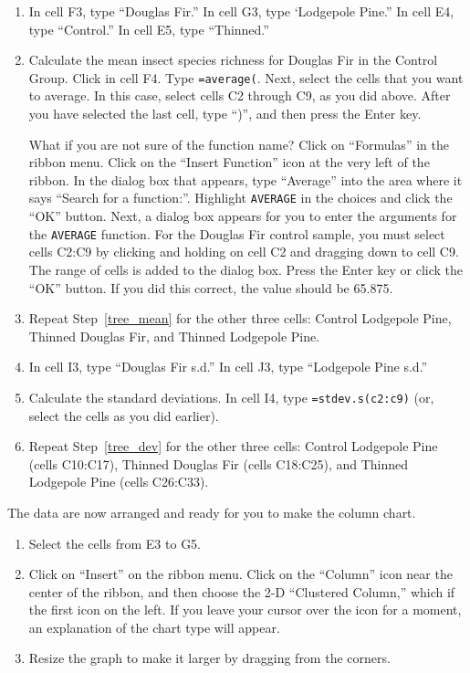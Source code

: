 \documentclass[12pt, hidelinks]{exam}
\begin{document}
\begin{enumerate}
	\item In cell F3, type “Douglas Fir.” In cell G3, type ‘Lodgepole Pine.” In cell E4, type “Control.” In cell E5, type “Thinned.” 

	\item \label{tree_mean} Calculate the mean insect species richness for Douglas Fir in the Control Group. Click in cell F4. Type \texttt{=average(}. Next, select the cells that you want to average. In this case, select cells C2 through C9, as you did above. After you have selected the last cell, type “)”, and then press the Enter key. 

What if you are not sure of the function name? Click on “Formulas” in the ribbon menu. Click on the “Insert Function” icon at the very left of the ribbon. In the dialog box that appears, type “Average” into the area where it says “Search for a function:”. Highlight \texttt{AVERAGE} in the choices and click the “OK” button. Next, a dialog box appears for you to enter the arguments for the \texttt{AVERAGE} function. For the Douglas Fir control sample, you must select cells C2:C9 by clicking and holding on cell C2 and dragging down to cell C9. The range of cells is added to the dialog box. Press the Enter key or click the “OK” button. If you did this correct, the value should be 65.875.

	\item Repeat Step~\ref{tree_mean} for the other three cells: Control Lodgepole Pine, Thinned Douglas Fir, and Thinned Lodgepole Pine. 
	
	\item \label{tree_dev} In cell I3, type ``Douglas Fir s.d.'' In cell J3, type ``Lodgepole Pine s.d.''
	
	\item Calculate the standard deviations. In cell I4, type \texttt{=stdev.s(c2:c9)} (or, select the cells as you did earlier).
	
	\item Repeat Step~\ref{tree_dev} for the other three cells: Control Lodgepole Pine (cells C10:C17), Thinned Douglas Fir (cells C18:C25), and Thinned Lodgepole Pine (cells C26:C33). 
	
\end{enumerate}

The data are now arranged and ready for you to make the column chart.

\begin{enumerate}[resume]
	\item Select the cells from E3 to G5.

	\item Click on “Insert” on the ribbon menu. Click on the “Column” icon near the center of the ribbon, and then choose the 2-D “Clustered Column,” which if the first icon on the left. If you leave your cursor over the icon for a moment, an explanation of the chart type will appear.

	\item Resize the graph to make it larger by dragging from the corners.
\end{enumerate}
\end{document}
